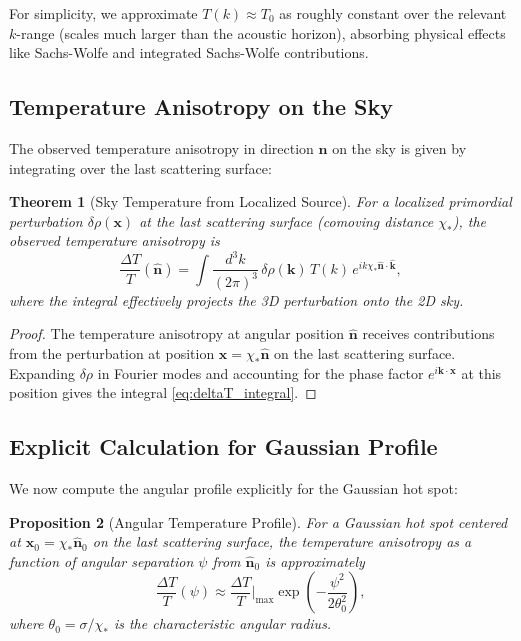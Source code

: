 \documentclass[11pt,a4paper]{article}
\theoremstyle{plain}
\newtheorem{theorem}{Theorem}[section]
\newtheorem{proposition}[theorem]{Proposition}
\theoremstyle{definition}
\theoremstyle{remark}
\begin{document}
For simplicity, we approximate $T(k) \approx T_0$ as roughly constant over the relevant $k$-range (scales much larger than the acoustic horizon), absorbing physical effects like Sachs-Wolfe and integrated Sachs-Wolfe contributions.

\subsection{Temperature Anisotropy on the Sky}

The observed temperature anisotropy in direction $\hat{\bm{n}}$ on the sky is given by integrating over the last scattering surface:

\begin{theorem}[Sky Temperature from Localized Source]\label{thm:sky_temp}
For a localized primordial perturbation $\delta\rho(\bm{x})$ at the last scattering surface (comoving distance $\chi_\ast$), the observed temperature anisotropy is
\begin{equation}\label{eq:deltaT_integral}
    \frac{\Delta T}{T}(\hat{\bm{n}}) = \int \frac{d^3k}{(2\pi)^3} \, \delta\rho(\bm{k}) \, T(k) \, e^{i k \chi_\ast \hat{\bm{n}} \cdot \hat{\bm{k}}},
\end{equation}
where the integral effectively projects the 3D perturbation onto the 2D sky.
\end{theorem}

\begin{proof}
The temperature anisotropy at angular position $\hat{\bm{n}}$ receives contributions from the perturbation at position $\bm{x} = \chi_\ast \hat{\bm{n}}$ on the last scattering surface. Expanding $\delta\rho$ in Fourier modes and accounting for the phase factor $e^{i\bm{k}\cdot\bm{x}}$ at this position gives the integral \eqref{eq:deltaT_integral}.
\end{proof}

\subsection{Explicit Calculation for Gaussian Profile}

We now compute the angular profile explicitly for the Gaussian hot spot:

\begin{proposition}[Angular Temperature Profile]\label{prop:angular_profile}
For a Gaussian hot spot centered at $\bm{x}_0 = \chi_\ast \hat{\bm{n}}_0$ on the last scattering surface, the temperature anisotropy as a function of angular separation $\psi$ from $\hat{\bm{n}}_0$ is approximately
\begin{equation}\label{eq:angular_temp_profile}
    \frac{\Delta T}{T}(\psi) \approx \frac{\Delta T}{T}\bigg|_{\text{max}} \exp\left( -\frac{\psi^2}{2\theta_0^2} \right),
\end{equation}
where $\theta_0 = \sigma / \chi_\ast$ is the characteristic angular radius.
\end{proposition}
\end{document}
